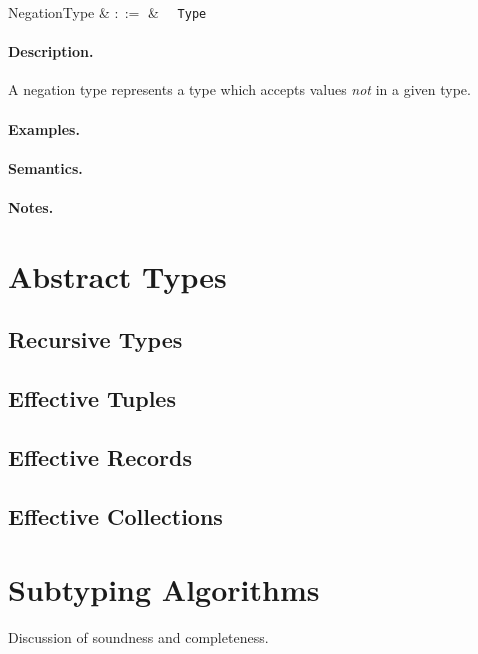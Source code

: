\begin{syntax}
  NegationType & $::=$ & \token{!}\ \ \verb+Type+\\
\end{syntax}

\paragraph{Description.}  A negation type represents a type which
accepts values {\em not} in a given type.

\paragraph{Examples.}

\paragraph{Semantics.}

\paragraph{Notes.}

\section{Abstract Types}
\subsection{Recursive Types}
\subsection{Effective Tuples}
\subsection{Effective Records}
\subsection{Effective Collections}

\section{Subtyping Algorithms}
Discussion of soundness and completeness.
